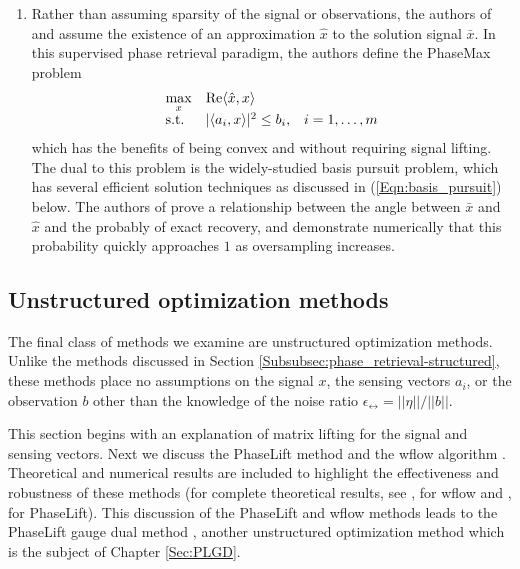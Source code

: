 \begin{enumerate}
\item

Rather than assuming sparsity of the signal or observations, the authors of \cite{goldstein2018phasemax} and \cite{bahmani2016phase} assume the existence of an approximation $\hat{x}$ to the solution signal $\bar{x}$.  In this supervised phase retrieval paradigm, the authors define the PhaseMax problem
\begin{equation}
\begin{array}{lll}
	\max\limits_x	&	\mathrm{Re} \langle \hat{x}, x \rangle 		\\
	\textnormal{s.t.} 			&	| \langle a_i, x \rangle |^2 \leq b_i, 	&	i = 1, \ldots, m
\end{array}
\end{equation}
which has the benefits of being convex and without requiring signal lifting.  The dual to this problem is the widely-studied basis pursuit problem, which has several efficient solution techniques as discussed in (\ref{Eqn:basis_pursuit}) below.  The authors of \cite{goldstein2018phasemax} prove a relationship between the angle between $\bar{x}$ and $\hat{x}$ and the probably of exact recovery, and demonstrate numerically that this probability quickly approaches $1$ as oversampling increases.


\end{enumerate}


\subsection{Unstructured optimization methods}	 	\label{Subsubsec:phase_retrieval-unstructured}


The final class of methods we examine are unstructured optimization methods.  Unlike the methods discussed in Section \ref{Subsubsec:phase_retrieval-structured}, these methods place no assumptions on the signal $x$, the sensing vectors $a_i$, or the observation $b$ other than the knowledge of the noise ratio $\epsilon_\rel = ||\eta|| / ||b||$.

This section begins with an explanation of matrix lifting for the signal and sensing vectors.  Next we discuss the PhaseLift method \cite{DBLP:journals/siamis/CandesESV13} and the wflow algorithm \cite{DBLP:journals/tit/CandesLS15}.   Theoretical and numerical results are included to highlight the effectiveness and robustness of these methods (for complete theoretical results, see \cite{DBLP:journals/tit/CandesLS15},  \cite{sun2016geometric} for wflow and \cite{candes2014solving}, \cite{candes2013phaselift} for PhaseLift).  This discussion of the PhaseLift and wflow methods leads to the PhaseLift gauge dual method \cite{DBLP:journals/siamsc/FriedlanderM16}, another unstructured optimization method which is the subject of Chapter \ref{Sec:PLGD}.




